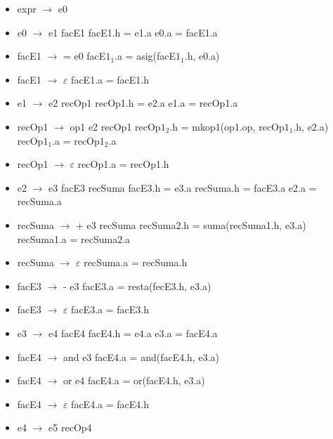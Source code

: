 \documentclass[11pt]{article}
\begin{document}
        \begin{itemize}
            \item expr $\rightarrow$ e0
            \item e0 $\rightarrow$ e1 facE1
                \subitem facE1.h = e1.a
                \subitem e0.a = facE1.a
            \item facE1 $\rightarrow$ = e0
                \subitem facE$1_1$.a = asig(facE$1_1$.h, e0.a)
            \item facE1 $\rightarrow$ $\varepsilon$
                \subitem facE1.a = facE1.h
            \item e1 $\rightarrow$ e2 recOp1
                \subitem recOp1.h = e2.a
                \subitem e1.a = recOp1.a
            \item recOp1 $\rightarrow$ op1 e2 recOp1
                \subitem recOp$1_2$.h = mkop1(op1.op, recOp$1_1$.h, e2.a)
                \subitem recOp$1_1$.a = recOp$1_2$.a
            \item recOp1 $\rightarrow$ $\varepsilon$
                \subitem recOp1.a = recOp1.h
            \item e2 $\rightarrow$ e3 facE3 recSuma
                \subitem facE3.h = e3.a
                \subitem recSuma.h = facE3.a
                \subitem e2.a = recSuma.a
            \item recSuma $\rightarrow$ + e3 recSuma
                \subitem recSuma2.h = suma(recSuma1.h, e3.a)
                \subitem recSuma1.a = recSuma2.a
            \item recSuma $\rightarrow$ $\varepsilon$
                \subitem recSuma.a = recSuma.h
            \item facE3 $\rightarrow$ - e3
                \subitem facE3.a = resta(fecE3.h, e3.a)
            \item facE3 $\rightarrow$ $\varepsilon$
                \subitem facE3.a = facE3.h
            \item e3 $\rightarrow$ e4 facE4
                \subitem facE4.h = e4.a
                \subitem e3.a = facE4.a
            \item facE4 $\rightarrow$ and e3
                \subitem facE4.a = and(facE4.h, e3.a)
            \item facE4 $\rightarrow$ or e4
                \subitem facE4.a = or(facE4.h, e3.a)
            \item facE4 $\rightarrow$ $\varepsilon$
                \subitem facE4.a = facE4.h
            \item e4 $\rightarrow$ e5 recOp4

\end{itemize}
\end{document}

